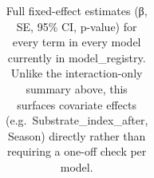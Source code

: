 \documentclass[
  12pt,
  a4paper,
  oneside]{scrbook}
\begin{document}
{

\begin{longtable}[]{@{}
  >{\raggedright\arraybackslash}p{}
  >{\raggedright\arraybackslash}p{}
  >{\raggedright\arraybackslash}p{}
  >{\raggedright\arraybackslash}p{}
  >{\raggedright\arraybackslash}p{}
  >{\raggedright\arraybackslash}p{}
  >{\raggedright\arraybackslash}p{}
  >{\raggedleft\arraybackslash}p{}
  >{\raggedleft\arraybackslash}p{}
  >{\raggedleft\arraybackslash}p{}
  >{\raggedleft\arraybackslash}p{}
  >{\raggedleft\arraybackslash}p{}
  >{\raggedleft\arraybackslash}p{}
  >{\raggedleft\arraybackslash}p{}@{}}

\caption{\label{tbl-models-summary-full-supp}Full fixed-effect estimates
(β, SE, 95\% CI, p-value) for every term in every model currently in
model\_registry. Unlike the interaction-only summary above, this
surfaces covariate effects (e.g.~Substrate\_index\_after, Season)
directly rather than requiring a one-off check per model.}

\tabularnewline


\end{longtable}}
\end{document}
